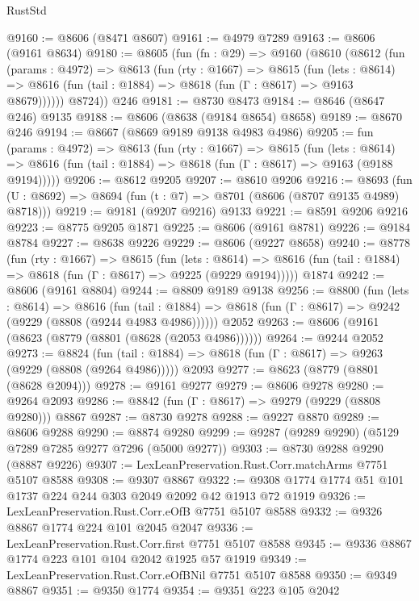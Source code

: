 \begin{lexlean}{RustStd}
\begin{coremodule}
@9160 := @8606 (@8471 @8607)
@9161 := @4979 @7289
@9163 := @8606 (@9161 @8634)
@9180 := @8605
    (fun (fn : @29) =>
    @9160
      (@8610
        (@8612
          (fun (params : @4972) =>
          @8613
            (fun (rty : @1667) =>
            @8615
              (fun (lets : @8614) =>
              @8616 (fun (tail : @1884) => @8618 (fun (Γ : @8617) => @9163 @8679))))))
        @8724))
    @246
@9181 := @8730 @8473
@9184 := @8646 (@8647 @246) @9135
@9188 := @8606 (@8638 (@9184 @8654) @8658)
@9189 := @8670 @246
@9194 := @8667 (@8669 @9189 @9138 @4983 @4986)
@9205 := fun (params : @4972) =>
  @8613
    (fun (rty : @1667) =>
    @8615
      (fun (lets : @8614) =>
      @8616 (fun (tail : @1884) => @8618 (fun (Γ : @8617) => @9163 (@9188 @9194)))))
@9206 := @8612 @9205
@9207 := @8610 @9206
@9216 := @8693 (fun (U : @8692) => @8694 (fun (t : @7) => @8701 (@8606 (@8707 @9135 @4989) @8718)))
@9219 := @9181 (@9207 @9216) @9133
@9221 := @8591 @9206 @9216
@9223 := @8775 @9205 @1871
@9225 := @8606 (@9161 @8781)
@9226 := @9184 @8784
@9227 := @8638 @9226
@9229 := @8606 (@9227 @8658)
@9240 := @8778
    (fun (rty : @1667) =>
    @8615
      (fun (lets : @8614) =>
      @8616 (fun (tail : @1884) => @8618 (fun (Γ : @8617) => @9225 (@9229 @9194)))))
    @1874
@9242 := @8606 (@9161 @8804)
@9244 := @8809 @9189 @9138
@9256 := @8800
    (fun (lets : @8614) =>
    @8616
      (fun (tail : @1884) => @8618 (fun (Γ : @8617) => @9242 (@9229 (@8808 (@9244 @4983 @4986))))))
    @2052
@9263 := @8606 (@9161 (@8623 (@8779 (@8801 (@8628 (@2053 @4986))))))
@9264 := @9244 @2052
@9273 := @8824
    (fun (tail : @1884) => @8618 (fun (Γ : @8617) => @9263 (@9229 (@8808 (@9264 @4986)))))
    @2093
@9277 := @8623 (@8779 (@8801 (@8628 @2094)))
@9278 := @9161 @9277
@9279 := @8606 @9278
@9280 := @9264 @2093
@9286 := @8842 (fun (Γ : @8617) => @9279 (@9229 (@8808 @9280))) @8867
@9287 := @8730 @9278
@9288 := @9227 @8870
@9289 := @8606 @9288
@9290 := @8874 @9280
@9299 := @9287 (@9289 @9290) (@5129 @7289 @7285 @9277 @7296 (@5000 @9277))
@9303 := @8730 @9288 @9290 (@8887 @9226)
@9307 := LexLeanPreservation.Rust.Corr.matchArms @7751 @5107 @8588
@9308 := @9307 @8867
@9322 := @9308 @1774 @1774 @51 @101 @1737 @224 @244 @303 @2049 @2092 @42 @1913 @72 @1919
@9326 := LexLeanPreservation.Rust.Corr.eOfB @7751 @5107 @8588
@9332 := @9326 @8867 @1774 @224 @101 @2045 @2047
@9336 := LexLeanPreservation.Rust.Corr.first @7751 @5107 @8588
@9345 := @9336 @8867 @1774 @223 @101 @104 @2042 @1925 @57 @1919
@9349 := LexLeanPreservation.Rust.Corr.eOfBNil @7751 @5107 @8588
@9350 := @9349 @8867
@9351 := @9350 @1774
@9354 := @9351 @223 @105 @2042

\end{coremodule}
\end{lexlean}
